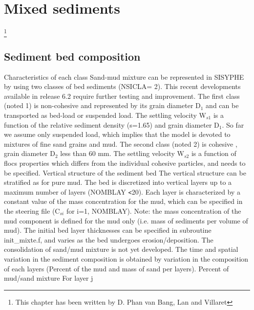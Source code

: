 \section{Mixed sediments}\footnote{This chapter has been written by D. Phan van Bang, Lan and Villaret}

\label{ch:mixed}

\subsection{Sediment bed composition}

Characteristics of each class\newline
Sand-mud mixture can be represented in SISYPHE by using two classes of bed
sediments (NSICLA= 2). This recent developments available in release 6.2
require further testing and improvement. \newline
The first class (noted 1) is non-cohesive and represented by its grain
diameter D$_{1}$ and can be transported as bed-load or suspended load. The
settling velocity W$_{s1}$ is a function of the relative sediment density
(s=1.65) and grain diameter D$_{1}$. So far we assume only suspended load,
which implies that the model is devoted to mixtures of fine sand grains and
mud.\newline
The second class (noted 2) is cohesive , grain diameter D$_{2}$ less than 60
mm. The settling velocity W$_{s2}$ is a function of flocs properties which
differs from the individual cohesive particles, and needs to be specified. 
\newline
Vertical structure of the sediment bed\newline
The vertical structure can be stratified as for pure mud. The bed is
discretized into vertical layers up to a maximum number of layers (NOMBLAY%
\texttt{<}20). Each layer is characterized by a constant value of the mass
concentration for the mud, which can be specified in the steering file (C$%
_{si}$ for i=1, NOMBLAY). \newline
Note: the mass concentration of the mud component is defined for the mud
only (i.e. mass of sediments per volume of mud). The initial bed layer
thicknesses can be specified in subroutine init\_mixte.f, and varies as the
bed undergoes erosion/deposition. The consolidation of sand/mud mixture is
not yet developed. \newline
The time and spatial variation in the sediment composition is obtained by
variation in the composition of each layers (Percent of the mud and mass of
sand per layers). \newline
Percent of mud/sand mixture\newline
For layer j\newline

